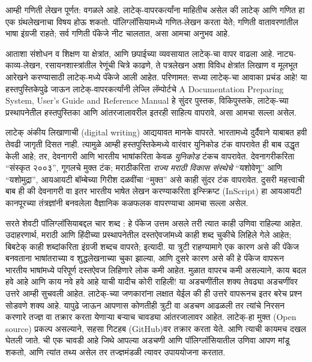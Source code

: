 \documentclass[11pt]{article}
\newcommand{\7}{\textbackslash}
\begin{document}
आम्ही गणिती लेखन पूर्णत: वगळले आहे. लाटेक्-वापरकर्त्यांना माहितीच असेल की लाटेक् आणि गणित हा एक ग्रंथलेखनाचा विषय होऊ शकतो. पॉलिग्लॉसियामध्ये गणित-लेखन करता येते; गणिती वातावरणांतील भाषा इंग्रजी राहते; सर्व गणिती पॅकेजे नीट चालतात, असा आमचा अनुभव आहे. 
\medskip

आताशा संशोधन व शिक्षण या क्षेत्रांत, आणि छपाईच्या व्यवसायात लाटेक्-चा वापर वाढला आहे. नाट्य-काव्य-लेखन, रसायनशास्त्रांतील रेणूंची चित्रे काढणे, ते पत्रलेखन अशा विविध क्षेत्रांत लिखाण व मूलभूत आरेखने करण्यासाठी लाटेक्-मध्ये पॅकेजे आली आहेत. परिणामत: सध्या लाटेक्-चा आवाका प्रचंड आहे! या हस्तपुस्तिकेपुढे जाऊन लाटेक्-वापरकर्त्यांनी लेज्लि लॅम्पोर्टचे {\Bask {\LaTeX} A Documentation Preparing System, User's Guide and Reference Manual} हे सुंदर पुस्तक, विकिपुस्तके, लाटेक्-च्या प्रस्थापनेतील हस्तपुस्तिका आणि आंतरजालावरील इतरही साहित्य वापरावे, असा आमचा सल्ला असेल.
\medskip

लाटेक् अंकीय लिखाणाची ({\Bask digital writing}) आद्ययावत मानके वापरते. भारतामध्ये दुर्दैवाने याबाबत हवी तेवढी जागृती दिसत नाही. त्यामुळे आम्ही हस्तपुस्तिकेमध्ये वारंवार युनिकोड टंक वापरावेत ही बाब उद्धृत केली आहे; तर, देवनागरी आणि भारतीय भाषांकरिता केवळ \emph{युनिकोड} टंकच वापरावेत. देवनागरीकरिता ``संस्कृत २००३'', गूगलचे मुक्त टंक; मराठीकरिता \emph{राज्य मराठी विकास संस्थेचे} ``यशोवेणू'' आणि ``यशोमुद्रा'', आयआयटी बॉम्बेच्या गिरीश दळवींचा ``मुक्त'' असे काही सुंदर टंक वापरावेत. दुसरी महत्त्वाची बाब ही की देवनागरी वा इतर भारतीय भाषेत लेखन करण्याकरिता इन्स्क्रिप्ट ({\Bask InScript}) हा आयआयटी कानपूरच्या तंत्रज्ञांनी बनवलेला वैज्ञानिक कळफलक वापरण्याचा आमचा सल्ला असेल.

\medskip

सरते शेवटी पॉलिग्लॉसियाबद्दल चार शब्द : हे पॅकेज उत्तम असले तरी त्यात काही उणिवा
राहिल्या आहेत. उदाहरणार्थ, मराठी आणि हिंदीच्या प्रस्थापनेतील दस्तऐवजांमध्ये काही
शब्द चुकीचे लिहिले गेले आहेत; बिबटेक् काही शब्दांकरिता इंग्रजी शब्दच वापरते;
इत्यादी. या त्रुटी राहण्यामागे एक कारण असे की पॅकेज बनवताना भाषांतराच्या व
शुद्धलेखनाच्या चुका झाल्या, आणि दुसरे कारण असे की हे पॅकेज वापरून भारतीय भाषांमध्ये
परिपूर्ण दस्तऐवज लिहिणारे लोक कमी आहेत. मुळात वापरच कमी असल्याने, काय बदल हवे
आहे आणि काय नवे हवे आहे याची यादीच कोरी राहिली! या अडचणींतील शक्य तेवढ्या
अडचणींवर उत्तरे आम्ही सुचवली आहेत. लाटेक्-च्या जणकारांना लक्षात येईल की ही उत्तरे
वापरूनच इतर बरेच प्रश्न सोडवणे शक्य आहे. यापुढे जाऊन आपणास कोणतीही त्रुटी वा अडचण आढळली तर त्यांचे निरसन करणारे तज्ज्ञ वा तक्रार करता येणाऱ्या बऱ्याच चावड्या आंतरजालावर आहेत. लाटेक्-हा मुक्त ({\Bask Open source}) प्रकल्प असल्याने, सहसा गिटहब ({\Bask GitHub})वर तक्रार करता येते. आणि त्याची कायमच दखल घेतली जाते. {\Bask \XeTeX}ची एक चावडी आहे जिथे आपल्या अडचणी आणि पॉलिग्लॉसियातील उणिवा आपण मांडू शकतो, आणि त्यांत तथ्य असेल तर तज्ज्ञमंडळी त्यावर उपाययोजना करतात.
\medskip
\end{document}
